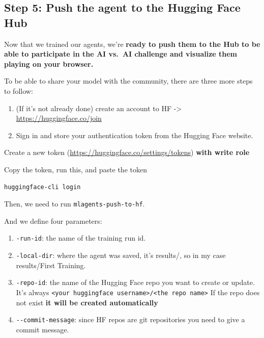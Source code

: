 \documentclass[11pt,a4paper]{article}
\begin{document}
\subsection{\texorpdfstring{Step 5: \textbf{Push the agent to the Hugging Face Hub}}{Step 5: Push the agent to the Hugging Face Hub}}\label{step-5-push-the-agent-to-the-hugging-face-hub}

Now that we trained our agents, we're \textbf{ready to push them to the Hub to be able to participate in the AI vs.~AI challenge and visualize them playing on your browser.}

To be able to share your model with the community, there are three more steps to follow:

\begin{enumerate}
\def\labelenumi{\arabic{enumi}.}
\item
  (If it's not already done) create an account to HF -\textgreater{} \url{https://huggingface.co/join}
\item
  Sign in and store your authentication token from the Hugging Face website.
\end{enumerate}

Create a new token (\url{https://huggingface.co/settings/tokens}) \textbf{with write role}


Copy the token, run this, and paste the token

\begin{lstlisting}
huggingface-cli login
\end{lstlisting}

Then, we need to run \texttt{mlagents-push-to-hf}.

And we define four parameters:

\begin{enumerate}
\def\labelenumi{\arabic{enumi}.}
\item
  \texttt{-run-id}: the name of the training run id.
\item
  \texttt{-local-dir}: where the agent was saved, it's results/, so in my case results/First Training.
\item
  \texttt{-repo-id}: the name of the Hugging Face repo you want to create or update. It's always \texttt{\textless{}your\ huggingface\ username\textgreater{}/\textless{}the\ repo\ name\textgreater{}} If the repo does not exist \textbf{it will be created automatically}
\item
  \texttt{-\/-commit-message}: since HF repos are git repositories you need to give a commit message.
\end{enumerate}
\end{document}
